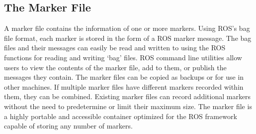 \subsection{The Marker File}
A marker file contains the information of one or more markers. Using ROS's bag file format, each marker is stored in the form of a ROS marker message. The bag files and their messages can easily be read and written to using the ROS functions for reading and writing `bag' files. ROS command line utilities allow users to view the contents of the marker file, add to them, or publish the messages they contain. The marker files can be copied as backups or for use in other machines. If multiple marker files have different markers recorded within them, they can be combined. Existing marker files can record additional markers without the need to predetermine or limit their maximum size. The marker file is a highly portable and accessible container optimized for the ROS framework capable of storing any number of markers.\\
